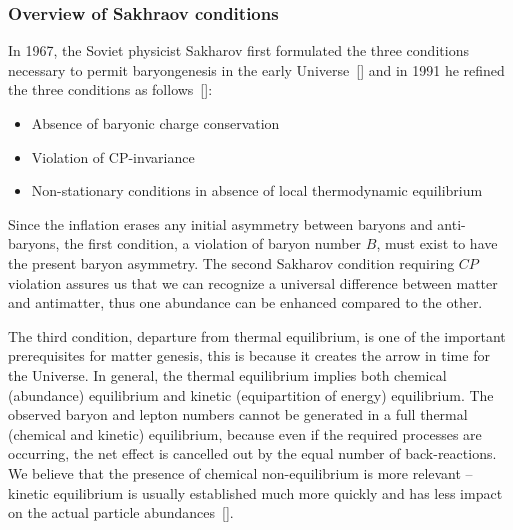\subsubsection{Overview of Sakhraov conditions}

In 1967, the Soviet physicist Sakharov first formulated the three conditions necessary to permit baryongenesis in the early Universe~[\cite{Sakharov:1967dj}] and in 1991 he refined the three conditions as follows~[\cite{Sakharov:1988vdp}]:
\begin{itemize}
  \item Absence of baryonic charge conservation 
  \item Violation of CP-invariance
  \item Non-stationary conditions in absence of local thermodynamic equilibrium
\end{itemize}



\noindent Since the inflation erases any initial asymmetry between baryons and anti-baryons, the first condition, a violation of baryon number $B$, must exist to have the present baryon asymmetry. The second Sakharov condition requiring $CP$ violation assures us that we can recognize a universal difference between matter and antimatter, thus one abundance can be enhanced compared to the other.


The third condition, departure from thermal equilibrium, is one of the important prerequisites for matter genesis, this is because it creates the arrow in time for the Universe. In general, the thermal equilibrium implies both chemical (abundance) equilibrium and kinetic (equipartition of energy) equilibrium. The observed baryon and lepton numbers cannot be generated in a full thermal (chemical and kinetic) equilibrium, because even if the required processes are occurring, the net effect is cancelled out by the equal number of back-reactions. We believe that the presence of chemical non-equilibrium is more relevant -- kinetic equilibrium is usually established much more quickly and has less impact on the actual particle abundances~[\cite{Koch:1986ud,Birrell:2014gea}]. 

